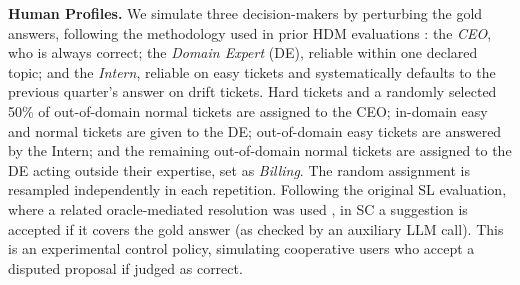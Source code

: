 \documentclass[a4paper,twoside]{article}
\begin{document}
\textbf{Human Profiles.}
We simulate three decision-makers by perturbing the gold answers,
following the methodology used in prior HDM evaluations
\cite{Mazzoni2024frank,mozannar2020consistent,tailor2024learning}: the \textit{CEO}, who is always correct; the \textit{Domain Expert} (DE), reliable within one declared topic; and the \textit{Intern}, reliable on easy tickets and systematically defaults to the previous quarter's answer on drift tickets.
Hard tickets and a randomly selected 50\% of out-of-domain normal tickets are assigned to the CEO; in-domain easy and normal tickets are given to the DE; out-of-domain easy tickets are answered by the Intern; and the remaining out-of-domain normal tickets are assigned to the DE acting outside their expertise, set as \textit{Billing}. The random assignment is resampled independently in each repetition. Following the original SL evaluation, where a related oracle-mediated resolution was used \cite{zeni2019fixing}, in SC a suggestion is accepted if it covers the gold answer (as checked by an auxiliary LLM call).
This is an experimental control policy, simulating cooperative users who accept a disputed proposal if judged as correct. 
\end{document}
